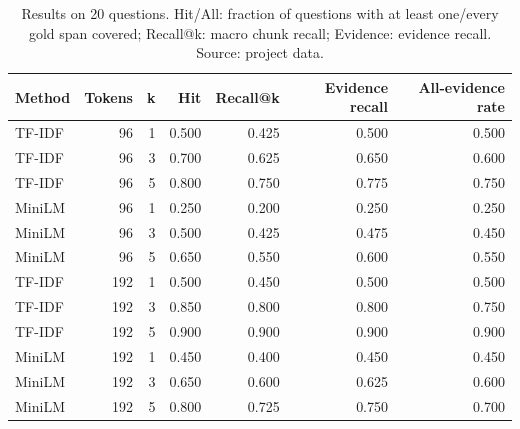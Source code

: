 \begin{table}[h]\centering\small
\begin{tabular}{lrrrrrr}\toprule
Method & Tokens & k & Hit & Recall@k & Evidence recall & All-evidence rate \\ \midrule
TF-IDF & 96 & 1 & 0.500 & 0.425 & 0.500 & 0.500 \\
TF-IDF & 96 & 3 & 0.700 & 0.625 & 0.650 & 0.600 \\
TF-IDF & 96 & 5 & 0.800 & 0.750 & 0.775 & 0.750 \\
MiniLM & 96 & 1 & 0.250 & 0.200 & 0.250 & 0.250 \\
MiniLM & 96 & 3 & 0.500 & 0.425 & 0.475 & 0.450 \\
MiniLM & 96 & 5 & 0.650 & 0.550 & 0.600 & 0.550 \\
TF-IDF & 192 & 1 & 0.500 & 0.450 & 0.500 & 0.500 \\
TF-IDF & 192 & 3 & 0.850 & 0.800 & 0.800 & 0.750 \\
TF-IDF & 192 & 5 & 0.900 & 0.900 & 0.900 & 0.900 \\
MiniLM & 192 & 1 & 0.450 & 0.400 & 0.450 & 0.450 \\
MiniLM & 192 & 3 & 0.650 & 0.600 & 0.625 & 0.600 \\
MiniLM & 192 & 5 & 0.800 & 0.725 & 0.750 & 0.700 \\
\bottomrule\end{tabular}
\caption{Results on 20 questions. Hit/All: fraction of questions with at least one/every gold span covered; Recall@k: macro chunk recall; Evidence: evidence recall. Source: project data.}\end{table}